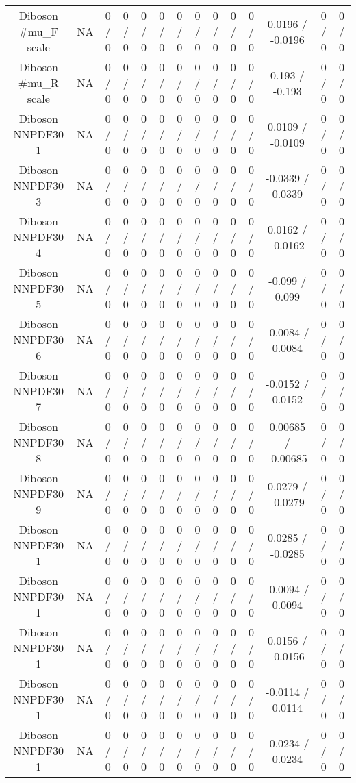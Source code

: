 \documentclass[10pt]{article}
\begin{document}
\begin{table}[htbp]
\begin{center}
\begin{tabular}{|c|c|c|c|c|c|c|c|c|c|c|c|c|c|}
  Diboson #mu_{F} scale &    NA    & 0 / 0 & 0 / 0 & 0 / 0 & 0 / 0 & 0 / 0 & 0 / 0 & 0 / 0 & 0 / 0 & 0 / 0 & 0.0196 / -0.0196 & 0 / 0 & 0 / 0 \\ 
  Diboson #mu_{R} scale &    NA    & 0 / 0 & 0 / 0 & 0 / 0 & 0 / 0 & 0 / 0 & 0 / 0 & 0 / 0 & 0 / 0 & 0 / 0 & 0.193 / -0.193 & 0 / 0 & 0 / 0 \\ 
  Diboson NNPDF30 1 &    NA    & 0 / 0 & 0 / 0 & 0 / 0 & 0 / 0 & 0 / 0 & 0 / 0 & 0 / 0 & 0 / 0 & 0 / 0 & 0.0109 / -0.0109 & 0 / 0 & 0 / 0 \\ 
  Diboson NNPDF30 3 &    NA    & 0 / 0 & 0 / 0 & 0 / 0 & 0 / 0 & 0 / 0 & 0 / 0 & 0 / 0 & 0 / 0 & 0 / 0 & -0.0339 / 0.0339 & 0 / 0 & 0 / 0 \\ 
  Diboson NNPDF30 4 &    NA    & 0 / 0 & 0 / 0 & 0 / 0 & 0 / 0 & 0 / 0 & 0 / 0 & 0 / 0 & 0 / 0 & 0 / 0 & 0.0162 / -0.0162 & 0 / 0 & 0 / 0 \\ 
  Diboson NNPDF30 5 &    NA    & 0 / 0 & 0 / 0 & 0 / 0 & 0 / 0 & 0 / 0 & 0 / 0 & 0 / 0 & 0 / 0 & 0 / 0 & -0.099 / 0.099 & 0 / 0 & 0 / 0 \\ 
  Diboson NNPDF30 6 &    NA    & 0 / 0 & 0 / 0 & 0 / 0 & 0 / 0 & 0 / 0 & 0 / 0 & 0 / 0 & 0 / 0 & 0 / 0 & -0.0084 / 0.0084 & 0 / 0 & 0 / 0 \\ 
  Diboson NNPDF30 7 &    NA    & 0 / 0 & 0 / 0 & 0 / 0 & 0 / 0 & 0 / 0 & 0 / 0 & 0 / 0 & 0 / 0 & 0 / 0 & -0.0152 / 0.0152 & 0 / 0 & 0 / 0 \\ 
  Diboson NNPDF30 8 &    NA    & 0 / 0 & 0 / 0 & 0 / 0 & 0 / 0 & 0 / 0 & 0 / 0 & 0 / 0 & 0 / 0 & 0 / 0 & 0.00685 / -0.00685 & 0 / 0 & 0 / 0 \\ 
  Diboson NNPDF30 9 &    NA    & 0 / 0 & 0 / 0 & 0 / 0 & 0 / 0 & 0 / 0 & 0 / 0 & 0 / 0 & 0 / 0 & 0 / 0 & 0.0279 / -0.0279 & 0 / 0 & 0 / 0 \\ 
  Diboson NNPDF30 1 &    NA    & 0 / 0 & 0 / 0 & 0 / 0 & 0 / 0 & 0 / 0 & 0 / 0 & 0 / 0 & 0 / 0 & 0 / 0 & 0.0285 / -0.0285 & 0 / 0 & 0 / 0 \\ 
  Diboson NNPDF30 1 &    NA    & 0 / 0 & 0 / 0 & 0 / 0 & 0 / 0 & 0 / 0 & 0 / 0 & 0 / 0 & 0 / 0 & 0 / 0 & -0.0094 / 0.0094 & 0 / 0 & 0 / 0 \\ 
  Diboson NNPDF30 1 &    NA    & 0 / 0 & 0 / 0 & 0 / 0 & 0 / 0 & 0 / 0 & 0 / 0 & 0 / 0 & 0 / 0 & 0 / 0 & 0.0156 / -0.0156 & 0 / 0 & 0 / 0 \\ 
  Diboson NNPDF30 1 &    NA    & 0 / 0 & 0 / 0 & 0 / 0 & 0 / 0 & 0 / 0 & 0 / 0 & 0 / 0 & 0 / 0 & 0 / 0 & -0.0114 / 0.0114 & 0 / 0 & 0 / 0 \\ 
  Diboson NNPDF30 1 &    NA    & 0 / 0 & 0 / 0 & 0 / 0 & 0 / 0 & 0 / 0 & 0 / 0 & 0 / 0 & 0 / 0 & 0 / 0 & -0.0234 / 0.0234 & 0 / 0 & 0 / 0 \\ 

\end{tabular}
\end{center}
\end{table}
\end{document}
